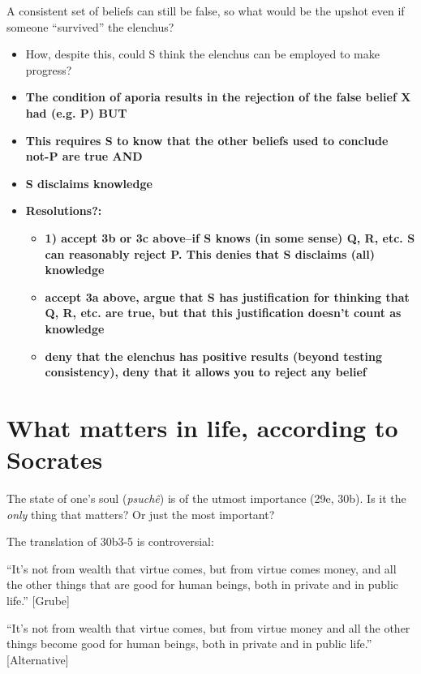 \documentclass[11pt]{article}
\begin{document}
\noindent A consistent set of beliefs can still be false, so what would be the upshot even if someone ``survived'' the elenchus?

\begin{itemize}\item{How, despite this, could S think the elenchus can be employed to make progress?}
\item{\textbf{The condition of aporia results in the rejection of the false belief X had (e.g. P) BUT}}\item{\textbf{This requires S to know that the other beliefs used to conclude not-P are true AND}}\item{\textbf{S disclaims knowledge}}\item{\textbf{Resolutions?:}}\begin{itemize}\item{\textbf{1) accept 3b or 3c above--if S knows (in some sense) Q, R, etc. S can reasonably reject P. This denies that S disclaims (all) knowledge}}\item{\textbf{accept 3a above, argue that S has justification for thinking that Q, R, etc. are true, but that this justification doesn't count as knowledge}}\item{\textbf{deny that the elenchus has positive results (beyond testing consistency), deny that it allows you to reject any belief}}
\end{itemize}
\end{itemize}

\section*{What matters in life, according to Socrates}

\noindent The state of one's soul (\emph{psuch\^{e}}) is of the utmost importance (29e, 30b). Is it the \emph{only} thing that matters? Or just the most important?
\vspace*{2mm}

\noindent The translation of 30b3-5 is controversial:
\vspace*{1mm}

\noindent ``It's not from wealth that virtue comes, but from virtue comes money, and all the other things that are good for human beings, both in private and in public life.'' [Grube]
\vspace*{2mm}

\noindent ``It's not from wealth that virtue comes, but from virtue money and all the other things become good for human beings, both in private and in public life.'' [Alternative]
\vspace*{2mm}
\end{document}
